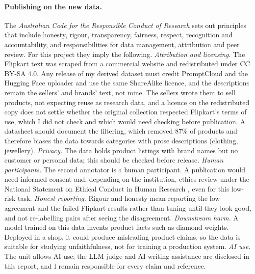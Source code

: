 \documentclass[11pt]{article}
\begin{document}
\paragraph{Publishing on the new data.} The \emph{Australian Code for the Responsible Conduct of Research} \citep{nhmrc-2018-code} sets out principles that include honesty, rigour, transparency, fairness, respect, recognition and accountability, and responsibilities for data management, attribution and peer review. For this project they imply the following.
\textit{Attribution and licensing.} The Flipkart text was scraped from a commercial website and redistributed under CC BY-SA 4.0. Any release of my derived dataset must credit PromptCloud and the Hugging Face uploader and use the same ShareAlike licence, and the descriptions remain the sellers' and brands' text, not mine. The sellers wrote them to sell products, not expecting reuse as research data, and a licence on the redistributed copy does not settle whether the original collection respected Flipkart's terms of use, which I did not check and which would need checking before publication. A datasheet \citep{gebru-etal-2021-datasheets} should document the filtering, which removed 87\% of products and therefore biases the data towards categories with prose descriptions (clothing, jewellery).
\textit{Privacy.} The data holds product listings with brand names but no customer or personal data; this should be checked before release.
\textit{Human participants.} The second annotator is a human participant. A publication would need informed consent and, depending on the institution, ethics review under the National Statement on Ethical Conduct in Human Research \citep{nhmrc-2023-national}, even for this low-risk task.
\textit{Honest reporting.} Rigour and honesty mean reporting the low agreement and the failed Flipkart results rather than tuning until they look good, and not re-labelling pairs after seeing the disagreement.
\textit{Downstream harm.} A model trained on this data invents product facts such as diamond weights. Deployed in a shop, it could produce misleading product claims, so the data is suitable for studying unfaithfulness, not for training a production system.
\textit{AI use.} The unit allows AI use; the LLM judge and AI writing assistance are disclosed in this report, and I remain responsible for every claim and reference.
\end{document}
